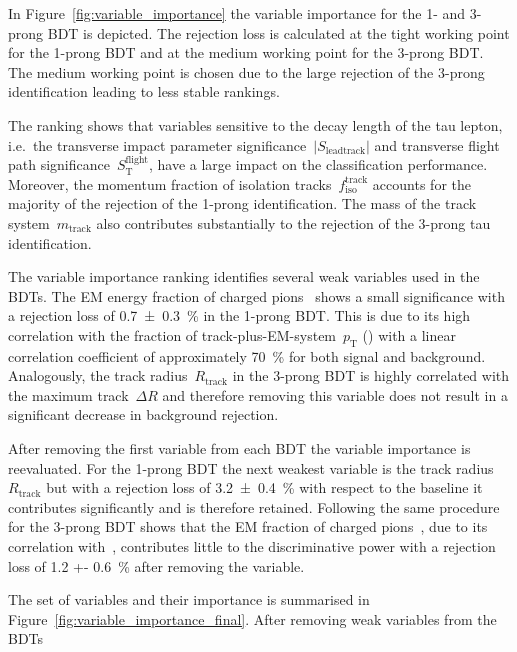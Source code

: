 In Figure~\ref{fig:variable_importance} the variable importance for the 1- and
3-prong BDT is depicted. The rejection loss is calculated at the tight working
point for the 1-prong BDT and at the medium working point for the 3-prong BDT.
The medium working point is chosen due to the large rejection of the 3-prong
identification leading to less stable rankings.

The ranking shows that variables sensitive to the decay length of the tau
lepton, i.e.\ the transverse impact parameter
significance~$|S_\text{leadtrack}|$ and transverse flight path
significance~$S_\text{T}^\text{flight}$, have a large impact on the
classification performance. Moreover, the momentum fraction of isolation
tracks~$f_\text{iso}^\text{track}$ accounts for the majority of the rejection of
the 1-prong identification. The mass of the track system~$m_\text{track}$ also
contributes substantially to the rejection of the 3-prong tau identification.

The variable importance ranking identifies several weak variables used in the
BDTs. The EM energy fraction of charged
pions~ shows a small significance with a
rejection loss of \SI{0.7 +- 0.3}{\percent} in the 1-prong BDT. This is due to
its high correlation with the fraction of track-plus-EM-system~$p_\text{T}$
() with a linear correlation
coefficient of approximately \SI{70}{\percent} for both signal and background.
Analogously, the track radius~$R_\text{track}$ in the 3-prong BDT is highly
correlated with the maximum track~$\Delta R$ and therefore removing this
variable does not result in a significant decrease in background rejection.

After removing the first variable from each BDT the variable importance is
reevaluated. For the 1-prong BDT the next weakest variable is the track
radius~$R_\text{track}$ but with a rejection loss of \SI{3.2 +- 0.4}{\percent}
with respect to the baseline it contributes significantly and is therefore
retained. Following the same procedure for the 3-prong BDT shows that the EM
fraction of charged pions~, due to its
correlation with~, contributes
little to the discriminative power with a rejection loss of \SI{1.2 +-
  0.6}{\percent} after removing the variable.

The set of variables and their importance is summarised in
Figure~\ref{fig:variable_importance_final}. After removing weak variables from
the BDTs

